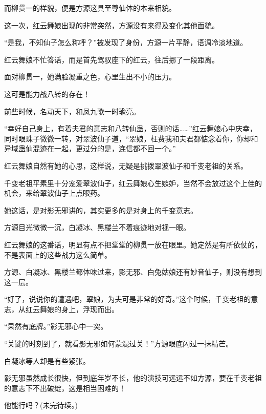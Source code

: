 \begin{this_body}
而柳贯一的样貌，便是方源这具至尊仙体的本来相貌。

这一次，红云舞娘出现的非常突然，方源没有来得及变化其他面貌。

“是我，不知仙子怎么称呼？”被发现了身份，方源一片平静，语调冷淡地道。

红云舞娘不忙答话，而是首先驾驭座下的红云，往后挪了一段距离。

面对柳贯一，她满脸凝重之色，心里生出不小的压力。

这可是能力战八转的存在！

前些时候，名动天下，和凤九歌一时瑜亮。

“幸好自己身上，有着夫君的意志和八转仙蛊，否则的话……”红云舞娘心中庆幸，同时眼珠子微微一转，对翠波仙子道，“翠娘，枉费我和夫君都惦念着你，你却和异域蛊仙混迹在一起，更过分的是，连信都不回一个。”

红云舞娘自然有她的心思，这样说，无疑是挑拨翠波仙子和千变老祖的关系。

千变老祖平素里十分宠爱翠波仙子，红云舞娘心生嫉妒，当然不会放过这个上佳的机会，来给翠波仙子上点眼药。

她这话，是对影无邪讲的，其实更多的是对身上的千变意志。

方源目光微微一沉，白凝冰、黑楼兰不着痕迹地对视一眼。

红云舞娘的这番话，明显有点不把堂堂的柳贯一放在眼里。她定然是有所依仗的，不是表面上的这些战力这么简单。

方源、白凝冰、黑楼兰都体味过来，影无邪、白兔姑娘还有妙音仙子，则没有想到这一层。

“好了，说说你的遭遇吧，翠娘，为夫可是非常的好奇。”这个时候，千变老祖的意志，从红云舞娘的身上，浮现而出。

“果然有底牌。”影无邪心中一突。

“关键的时刻到了，就看影无邪如何蒙混过关！”方源眼底闪过一抹精芒。

白凝冰等人却是有些紧张。

影无邪虽然成长很快，但到底年岁不长，他的演技可远远不如方源，要在千变老祖的意志下不出破绽，这是相当困难的！

他能行吗？(未完待续。)

\end{this_body}

